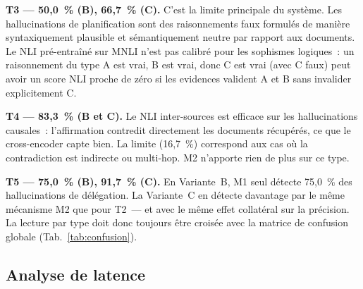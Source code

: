 \documentclass[12pt,a4paper]{article}
\begin{document}
\textbf{T3 --- 50,0~\% (B), 66,7~\% (C).} C'est la limite principale du système. Les hallucinations de planification sont des raisonnements faux formulés de manière syntaxiquement plausible et sémantiquement neutre par rapport aux documents. Le NLI pré-entraîné sur MNLI n'est pas calibré pour les sophismes logiques~: un raisonnement du type \og{}A est vrai, B est vrai, donc C est vrai\fg{} (avec C faux) peut avoir un score NLI proche de zéro si les evidences valident A et B sans invalider explicitement C.

\textbf{T4 --- 83,3~\% (B et C).} Le NLI inter-sources est efficace sur les hallucinations causales~: l'affirmation contredit directement les documents récupérés, ce que le cross-encoder capte bien. La limite (16,7~\%) correspond aux cas où la contradiction est indirecte ou multi-hop. M2 n'apporte rien de plus sur ce type.

\textbf{T5 --- 75,0~\% (B), 91,7~\% (C).} En Variante~B, M1 seul détecte 75,0~\% des hallucinations de délégation. La Variante~C en détecte davantage par le même mécanisme M2 que pour T2~--- et avec le même effet collatéral sur la précision. La lecture par type doit donc toujours être croisée avec la matrice de confusion globale (Tab.~\ref{tab:confusion}).

\subsection{Analyse de latence}
\end{document}
